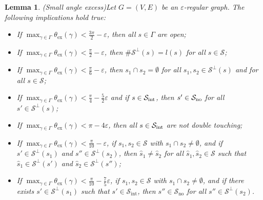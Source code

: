\documentclass[reqno]{amsart}
\newcommand{\eps}{\varepsilon}
\theoremstyle{plain}
\newtheorem{lemma}[theorem]{Lemma}
\theoremstyle{definition}
\numberwithin{equation}{section}
\begin{document}
\begin{lemma}(Small angle excess)\label{lemma:excess} Let $G=(V,E)$ be an $\eps$-regular graph. The following implications hold true:
\begin{itemize}
\item[\rm (i)] If  $\displaystyle\max_{\gamma \in \Gamma} \theta_{\mathrm{ex}}(\gamma) < \frac{3\pi}{2}-\eps   $, then all $s \in \Gamma$ are open;
\item[\rm (ii)]  If $\displaystyle \max_{\gamma \in \Gamma} \theta_{\mathrm{ex}}(\gamma) < \frac{\pi}{2}-\varepsilon$, then $\#\mathcal{S}^\perp(s) = l(s)$ for all $s \in \mathcal{S}$;
\item[\rm (iii)] If $\displaystyle \max_{\gamma \in \Gamma} \theta_{\mathrm{ex}}(\gamma) < \frac{\pi}{6}-\varepsilon$, then $s_1 \cap s_2= \emptyset$ for all $s_1,s_2 \in \mathcal{S}^\perp(s)$ and for all $s \in \mathcal{S}$;
\item[\rm (iv)] If $\displaystyle \max_{\gamma \in \Gamma} \theta_{\mathrm{ex}}(\gamma) <\frac{\pi}{4}-\frac{5}{2}\varepsilon  $  and if $s\in \mathcal{S}_{\rm int}$, then $s' \in \mathcal{S}_{\rm no}$ for all $s' \in \mathcal{S}^\perp(s)$; 
\item[\rm (v)] If $\displaystyle \max_{\gamma \in \Gamma} \theta_{\mathrm{ex}}(\gamma) < \pi-4\varepsilon$, then all $s \in\mathcal{S}_{\rm int}$ are not double touching;
\item[\rm (vi)] If $\displaystyle \max_{\gamma \in \Gamma} \theta_{\mathrm{ex}}(\gamma) <\frac{\pi}{10}-\varepsilon$, if  $s_1,s_2 \in \mathcal{S}$ with $s_1 \cap s_2 \neq \emptyset$,  and if   $s' \in \mathcal{S}^\perp(s_1)$ and $s'' \in \mathcal{S}^\perp(s_2)$, then  $\hat{s}_1 \neq \hat{s}_2$ for all  $\hat{s}_1,\hat{s}_2 \in \mathcal{S}$ such that $\hat{s}_1 \in \mathcal{S}^\perp(s') $ and   $\hat{s}_2 \in \mathcal{S}^\perp(s'') $;
\item[\rm (vii)] If $\displaystyle \max_{\gamma \in \Gamma} \theta_{\mathrm{ex}}(\gamma) <\frac{\pi}{10}-  \frac{7}{5}  \varepsilon$, if  $s_1,s_2 \in \mathcal{S}$ with $s_1 \cap s_2 \neq \emptyset$,  and if there exists  $s' \in \mathcal{S}^\perp(s_1)$ such that $s'\in \mathcal{S}_\mathrm{int}$, then $s''\in \mathcal{S}_{\mathrm{no}}$ for all  $s'' \in \mathcal{S}^\perp(s_2)$.   
\end{itemize}
\end{lemma}
 

 
\end{document}
